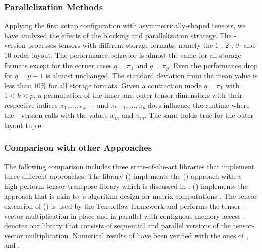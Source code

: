 \subsubsection{Parallelization Methods}
Applying the first setup configuration with asymmetrically-shaped tensors, we have analyzed the effects of the blocking and parallelization strategy.
The - version processes tensors with different storage formats, namely the $1$-, $2$-, $9$- and $10$-order layout.
The performance behavior is almost the same for all storage formats except for the corner cases $q = \pi_1$ and $q = \pi_p$.
Even the performance drop for $q = p-1$ is almost unchanged.
The standard deviation from the mean value is less than $10$\% for all storage formats.
Given a contraction mode $q = \pi_k$ with $1 < k < p$, a permutation of the inner and outer tensor dimensions with their respective indices $\pi_1, \dots,  \pi_{k-1}$ and $\pi_{k+1}, \dots, \pi_{p}$ does influence the runtime where the - version calls  with the values $w_m$ and $n_m$.
The same holds true for the outer layout tuple.



\subsubsection{Comparison with other Approaches}
The following comparison includes three state-of-the-art libraries that implement three different approaches.
The library  () implements the () approach with a high-perform tensor-transpose library  which is discussed in \cite{springer:2018:design}.
 () implements the  approach that is akin to 's algorithm design for matrix computations \cite{matthews:2018:high}.
The tensor extension of  () is used by the Tensorflow framework and performs the tensor-vector multiplication in-place and in parallel with contiguous memory access \cite{abadi:2016:tensorflow}.
 denotes our library that consists of sequential and parallel versions of the tensor-vector multiplication.
Numerical results of  have been verified with the ones of ,  and .

